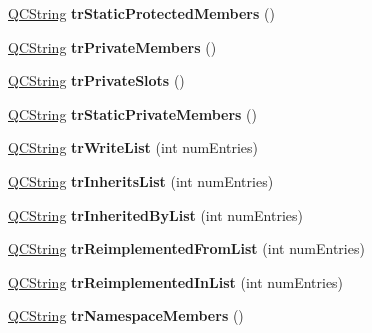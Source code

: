 \begin{DoxyCompactItemize}
\mbox{\hyperlink{class_q_c_string}{Q\+C\+String}} {\bfseries tr\+Static\+Protected\+Members} ()
\item 
\mbox{\label{class_translator_dutch_aaa630cb62e114f10e68d8e13baa715f7}} 
\mbox{\hyperlink{class_q_c_string}{Q\+C\+String}} {\bfseries tr\+Private\+Members} ()
\item 
\mbox{\label{class_translator_dutch_a4b1d79eb165c9e2cb0849351f6103969}} 
\mbox{\hyperlink{class_q_c_string}{Q\+C\+String}} {\bfseries tr\+Private\+Slots} ()
\item 
\mbox{\label{class_translator_dutch_aba6f6b6b270f09b4b4907ecae39d447b}} 
\mbox{\hyperlink{class_q_c_string}{Q\+C\+String}} {\bfseries tr\+Static\+Private\+Members} ()
\item 
\mbox{\label{class_translator_dutch_aa1506536e6b506bd806900326a92cde2}} 
\mbox{\hyperlink{class_q_c_string}{Q\+C\+String}} {\bfseries tr\+Write\+List} (int num\+Entries)
\item 
\mbox{\label{class_translator_dutch_af3751d5796471c476070e62d455246b6}} 
\mbox{\hyperlink{class_q_c_string}{Q\+C\+String}} {\bfseries tr\+Inherits\+List} (int num\+Entries)
\item 
\mbox{\label{class_translator_dutch_a2e1270963a6ac75701cad5e9a5ddbf92}} 
\mbox{\hyperlink{class_q_c_string}{Q\+C\+String}} {\bfseries tr\+Inherited\+By\+List} (int num\+Entries)
\item 
\mbox{\label{class_translator_dutch_a70c0d401a727cace424b53ffa0599eab}} 
\mbox{\hyperlink{class_q_c_string}{Q\+C\+String}} {\bfseries tr\+Reimplemented\+From\+List} (int num\+Entries)
\item 
\mbox{\label{class_translator_dutch_a7bfba9ec083ef502af403578a65b2cba}} 
\mbox{\hyperlink{class_q_c_string}{Q\+C\+String}} {\bfseries tr\+Reimplemented\+In\+List} (int num\+Entries)
\item 
\mbox{\label{class_translator_dutch_a0a67ae237b8835cfc17e31b84d9ba1d8}} 
\mbox{\hyperlink{class_q_c_string}{Q\+C\+String}} {\bfseries tr\+Namespace\+Members} ()

\end{DoxyCompactItemize}
